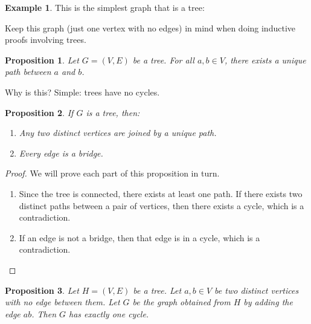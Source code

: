 \documentclass[]{article}
\newtheorem*{proposition}{Proposition}
\theoremstyle{definition}
\newtheorem{ex}{Example}[section]
\newcommand{\lecture}[1]{\marginpar{{\footnotesize $\leftarrow$ \underline{#1}}}}
\begin{document}
			\begin{ex}
				This is the simplest graph that is a tree:
				\begin{center}
				\end{center}

				Keep this graph (just one vertex with no edges) in mind when doing inductive proofs involving trees.
			\end{ex}

			\begin{proposition}
				Let $G = (V, E)$ be a tree. For all $a, b \in V$, there exists a unique path between $a$ and $b$.
			\end{proposition}

			Why is this? Simple: trees have no cycles.
			
			\begin{proposition} \lecture{March 8, 2013}
				If $G$ is a tree, then:
				\begin{enumerate}
					\item Any two distinct vertices are joined by a unique path.
					\item Every edge is a bridge.
				\end{enumerate}
			\end{proposition}

			\begin{proof}
				We will prove each part of this proposition in turn.
				\begin{enumerate}
					\item Since the tree is connected, there exists at least one path. If there exists two distinct paths between a pair of vertices, then there exists a cycle, which is a contradiction.
					\item If an edge is not a bridge, then that edge is in a cycle, which is a contradiction.
				\end{enumerate}
			\end{proof}

			\begin{proposition}
				Let $H = (V, E)$ be a tree. Let $a, b \in V$ be two distinct vertices with no edge between them. Let $G$ be the graph obtained from $H$ by adding the edge $ab$. Then $G$ has exactly one cycle.
			\end{proposition}
\end{document}
